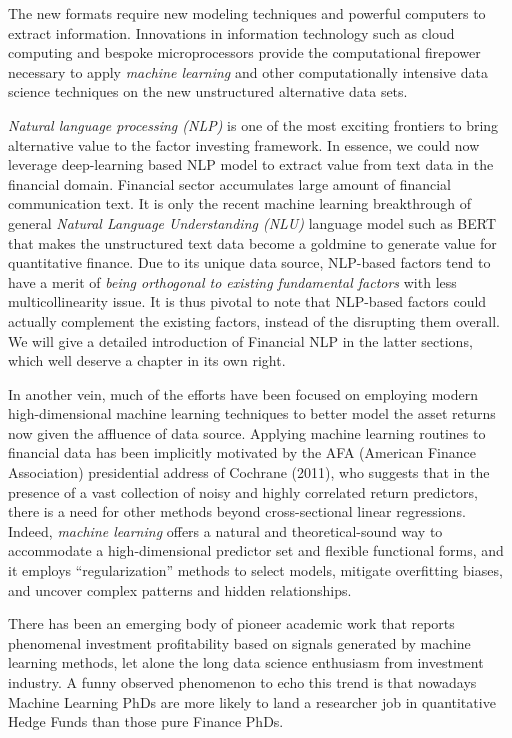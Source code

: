 \documentclass[
]{book}
\begin{document}
The new formats require new modeling techniques and powerful computers to extract information. Innovations in information technology such as cloud computing and bespoke microprocessors provide the computational firepower necessary to apply {\emph{machine learning}} and other computationally intensive data science techniques on the new unstructured alternative data sets.

{\emph{Natural language processing (NLP)}} is one of the most exciting frontiers to bring alternative value to the factor investing framework. In essence, we could now leverage deep-learning based NLP model to extract value from text data in the financial domain. Financial sector accumulates large amount of financial communication text. It is only the recent machine learning breakthrough of general {\emph{Natural Language Understanding (NLU)}} language model such as BERT \citep{devlin2018bert} that makes the unstructured text data become a goldmine to generate value for quantitative finance. Due to its unique data source, NLP-based factors tend to have a merit of {\emph{being orthogonal to existing fundamental factors}} with less multicollinearity issue. It is thus pivotal to note that NLP-based factors could actually complement the existing factors, instead of the disrupting them overall. We will give a detailed introduction of Financial NLP in the latter sections, which well deserve a chapter in its own right.

In another vein, much of the efforts have been focused on employing modern high-dimensional machine learning techniques to better model the asset returns now given the affluence of data source. Applying machine learning routines to financial data has been implicitly motivated by the AFA (American Finance Association) presidential address of Cochrane (2011), who suggests that in the presence of a vast collection of noisy and highly correlated return predictors, there is a need for other methods beyond cross-sectional linear regressions. Indeed, {\emph{machine learning}} offers a natural and theoretical-sound way to accommodate a high-dimensional predictor set and flexible functional forms, and it employs ``regularization'' methods to select models, mitigate overfitting biases, and uncover complex patterns and hidden relationships.

There has been an emerging body of pioneer academic work that reports phenomenal investment profitability based on signals generated by machine learning methods, let alone the long data science enthusiasm from investment industry. A funny observed phenomenon to echo this trend is that nowadays Machine Learning PhDs are more likely to land a researcher job in quantitative Hedge Funds than those pure Finance PhDs.
\end{document}

